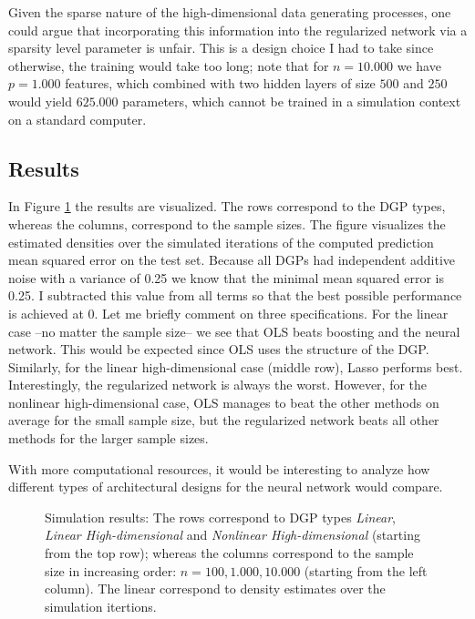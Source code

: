 \begin{remark}
    Given the sparse nature of the high-dimensional data generating processes, one could
    argue that incorporating this information into the regularized network via a
    sparsity level parameter is unfair. This is a design choice I had to take since
    otherwise, the training would take too long; note that for $n = 10.000$ we have $p =
    1.000$ features, which combined with two hidden layers of size $500$ and $250$ would
    yield $625.000$ parameters, which cannot be trained in a simulation context on a
    standard computer.
\end{remark}

\subsection{Results}

In Figure \ref{fig:simulation} the results are visualized. The rows correspond to the
DGP types, whereas the columns, correspond to the sample sizes. The figure visualizes
the estimated densities over the simulated iterations of the computed prediction mean
squared error on the test set. Because all DGPs had independent additive noise with a
variance of 0.25 we know that the minimal mean squared error is 0.25. I subtracted this
value from all terms so that the best possible performance is achieved at 0. Let me
briefly comment on three specifications. For the linear case --no matter the sample
size-- we see that OLS beats boosting and the neural network. This would be expected
since OLS uses the structure of the DGP. Similarly, for the linear high-dimensional case
(middle row), Lasso performs best. Interestingly, the regularized network is always the
worst. However, for the nonlinear high-dimensional case, OLS manages to beat the other
methods on average for the small sample size, but the regularized network beats all
other methods for the larger sample sizes.

With more computational resources, it would be interesting to analyze how different
types of architectural designs for the neural network would compare.

\begin{figure}
    \noindent{}
    \caption{Simulation results: The rows correspond to DGP types \textit{Linear},
    \textit{Linear High-dimensional} and \textit{Nonlinear High-dimensional} (starting
    from the top row); whereas the columns correspond to the sample size in increasing
    order: $n = 100, 1.000, 10.000$ (starting from the left column). The linear
    correspond to density estimates over the simulation itertions.}
    \label{fig:simulation}
\end{figure}

